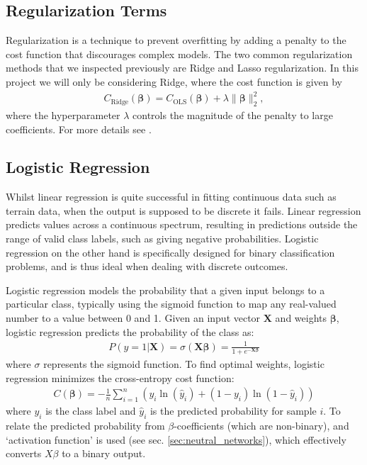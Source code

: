 \documentclass[%
reprint,s
amsmath,amssymb,
aps,
]{revtex4-2}
\begin{document}
\subsection{Regularization Terms}
Regularization is a technique to prevent overfitting by adding a penalty to the cost function that discourages complex models. The two common regularization methods that we inspected previously are Ridge and Lasso regularization. In this project we will only be considering Ridge, where the cost function is given by
\begin{align}
	C_\text{Ridge}(\bm \beta) = C_\text{OLS}(\bm \beta) + \lambda \|\bm \beta\|_2^2,
\end{align}
where the hyperparameter $\lambda$ controls the magnitude of the penalty to large coefficients. For more details see \cite{project1}.

\subsection{Logistic Regression}
Whilst linear regression is quite successful in fitting continuous data such as terrain data, when the output is supposed to be discrete it fails. Linear regression predicts values across a continuous spectrum, resulting in predictions outside the range of valid class labels, such as giving negative probabilities. Logistic regression on the other hand is specifically designed for binary classification problems, and is thus ideal when dealing with discrete outcomes. 

Logistic regression models the probability that a given input belongs to a particular class, typically using the sigmoid function to map any real-valued number to a value between 0 and 1. Given an input vector $\bm X$ and weights $\bm\beta$, logistic regression predicts the probability of the class as:
\begin{align}
	P(y=1|\bm X)=\sigma(\bm X\bm\beta)=\frac{1}{1+e^{-\bm X\bm\beta}}
\end{align}
where $\sigma$ represents the sigmoid function. To find optimal weights, logistic regression minimizes the cross-entropy cost function:
\begin{align}
	C(\bm\beta)=-\frac1n\sum_{i=1}^n\left(y_i \ln(\hat y_i)+(1-y_i)\ln(1-\hat y_i) \right)
\end{align}
where $y_i$ is the class label and $\hat{y}_i$ is the predicted probability for sample $i$. To relate the predicted probability from \(\beta\)-coefficients (which are non-binary), and `activation function' is used (see sec. \ref{sec:neutral_networks}), which effectively converts \(X\beta\) to a binary output. 
\end{document}
